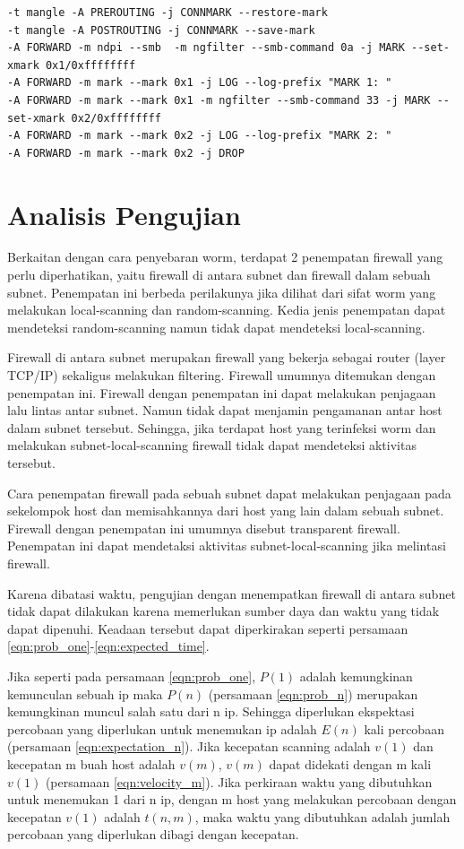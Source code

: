 \begin{lstlisting}
-t mangle -A PREROUTING -j CONNMARK --restore-mark
-t mangle -A POSTROUTING -j CONNMARK --save-mark
-A FORWARD -m ndpi --smb  -m ngfilter --smb-command 0a -j MARK --set-xmark 0x1/0xffffffff
-A FORWARD -m mark --mark 0x1 -j LOG --log-prefix "MARK 1: "
-A FORWARD -m mark --mark 0x1 -m ngfilter --smb-command 33 -j MARK --set-xmark 0x2/0xffffffff
-A FORWARD -m mark --mark 0x2 -j LOG --log-prefix "MARK 2: "
-A FORWARD -m mark --mark 0x2 -j DROP
\end{lstlisting} 

\section{Analisis Pengujian}

Berkaitan dengan cara penyebaran worm, terdapat 2 penempatan firewall yang perlu diperhatikan, yaitu firewall di antara subnet dan firewall dalam sebuah subnet. Penempatan ini berbeda perilakunya jika dilihat dari sifat worm yang melakukan local-scanning dan random-scanning. Kedia jenis penempatan dapat mendeteksi random-scanning namun tidak dapat mendeteksi local-scanning.

Firewall di antara subnet merupakan firewall yang bekerja sebagai router (layer TCP/IP) sekaligus melakukan filtering. Firewall umumnya ditemukan dengan penempatan ini. Firewall dengan penempatan ini dapat melakukan penjagaan lalu lintas antar subnet. Namun tidak dapat menjamin pengamanan antar host dalam subnet tersebut. Sehingga, jika terdapat host yang terinfeksi worm dan melakukan subnet-local-scanning firewall tidak dapat mendeteksi aktivitas tersebut.

Cara penempatan firewall pada sebuah subnet dapat melakukan penjagaan pada sekelompok host dan memisahkannya dari host yang lain dalam sebuah subnet. Firewall dengan penempatan ini umumnya disebut transparent firewall. Penempatan ini dapat mendetaksi aktivitas subnet-local-scanning jika melintasi firewall.

Karena dibatasi waktu, pengujian dengan menempatkan firewall di antara subnet tidak dapat dilakukan karena memerlukan sumber daya dan waktu yang tidak dapat dipenuhi.  Keadaan tersebut dapat diperkirakan seperti persamaan \ref{eqn:prob_one}-\ref{eqn:expected_time}.

Jika seperti pada persamaan \ref{eqn:prob_one}, $P(1)$ adalah kemungkinan kemunculan sebuah ip maka $P(n)$ (persamaan \ref{eqn:prob_n}) merupakan kemungkinan muncul salah satu dari n ip. Sehingga diperlukan ekspektasi percobaan yang diperlukan untuk menemukan ip adalah $E(n)$ kali percobaan (persamaan \ref{eqn:expectation_n}). Jika kecepatan scanning adalah $v(1)$ dan kecepatan m buah host adalah $v(m)$, $v(m)$ dapat didekati dengan m kali $v(1)$ (persamaan \ref{eqn:velocity_m}). Jika perkiraan waktu yang dibutuhkan untuk menemukan 1 dari n ip, dengan m host yang melakukan percobaan dengan kecepatan $v(1)$ adalah $t(n,m)$, maka waktu yang dibutuhkan adalah jumlah percobaan yang diperlukan dibagi dengan kecepatan.

